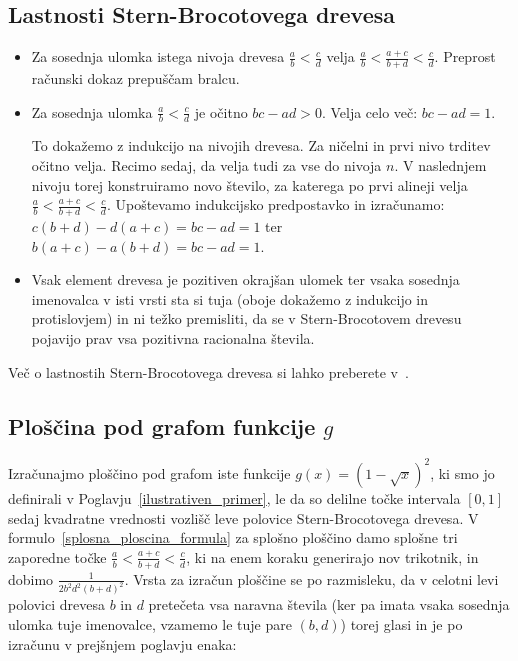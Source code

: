 \documentclass[a4paper, 12pt, titlepage]{article}
\begin{document}
\subsection*{Lastnosti Stern-Brocotovega drevesa}

\begin{itemize}
    \item Za sosednja ulomka istega nivoja drevesa $ \frac{a}{b} < \frac{c}{d} $ velja $ \frac{a}{b} < \frac{a+c}{b+d} < \frac{c}{d} $. Preprost računski dokaz prepuščam bralcu.
    \item Za sosednja ulomka $ \frac{a}{b} < \frac{c}{d} $ je očitno $ bc - ad > 0 $. Velja celo več: $ bc - ad = 1 $.
    
    To dokažemo z indukcijo na nivojih drevesa. Za ničelni in prvi nivo trditev očitno velja. Recimo sedaj, da velja tudi za vse do nivoja $ n $. V naslednjem nivoju torej konstruiramo novo število, za katerega po prvi alineji velja $ \frac{a}{b} < \frac{a+c}{b+d} < \frac{c}{d} $. Upoštevamo indukcijsko predpostavko in izračunamo: $ c(b+d) - d(a+c) = bc-ad = 1 $ ter $ b(a+c) - a(b+d)  = bc-ad = 1 $.
    \item Vsak element drevesa je pozitiven okrajšan ulomek ter vsaka sosednja imenovalca v isti vrsti sta si tuja (oboje dokažemo z indukcijo in protislovjem) in ni težko premisliti, da se v Stern-Brocotovem drevesu pojavijo prav vsa pozitivna racionalna števila.
\end{itemize}

\noindent Več o lastnostih Stern-Brocotovega drevesa si lahko preberete v~\cite{sb_drevo}.

\subsection*{Ploščina pod grafom funkcije $ g $}

Izračunajmo ploščino pod grafom iste funkcije $ g(x) = (1 - \sqrt{x})^2 $, ki smo jo definirali v Poglavju~\ref{ilustrativen_primer}, le da so delilne točke intervala $ [0,1] $ sedaj kvadratne vrednosti vozlišč leve polovice Stern-Brocotovega drevesa. V formulo~\eqref{splosna_ploscina_formula} za splošno ploščino damo splošne tri zaporedne točke $ \frac{a}{b} < \frac{a+c}{b+d} < \frac{c}{d} $, ki na enem koraku generirajo nov trikotnik, in dobimo $ \frac{1}{2b^2d^2(b+d)^2} $. Vrsta za izračun ploščine se po razmisleku, da v celotni levi polovici drevesa $ b $ in $ d $ pretečeta vsa naravna števila (ker pa imata vsaka sosednja ulomka tuje imenovalce, vzamemo le tuje pare $ (b,d) $) torej glasi in je po izračunu v prejšnjem poglavju enaka:
\end{document}
